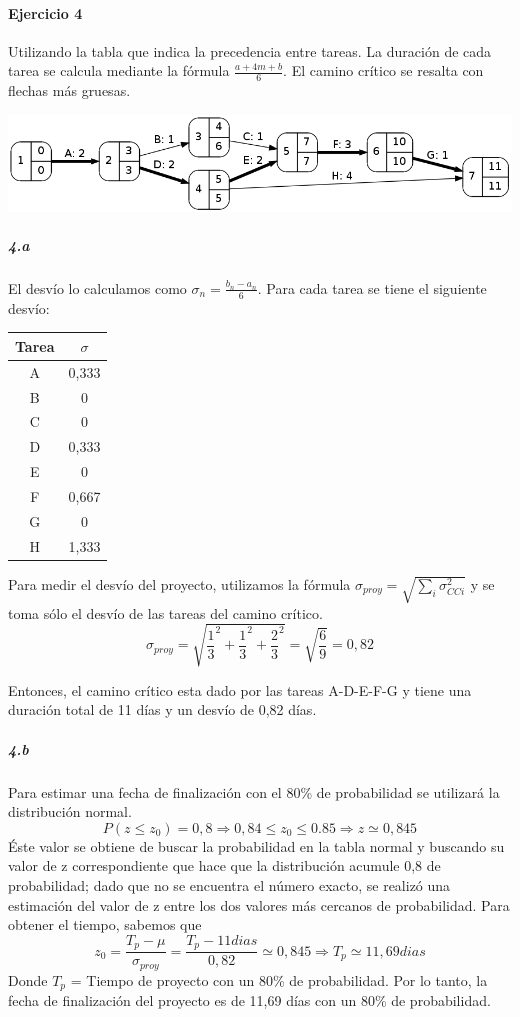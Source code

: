 \documentclass[a4paper,10pt]{article}
\begin{document}
  
  
\paragraph{Ejercicio 4} Utilizando la tabla que indica la precedencia entre tareas. La duración de cada tarea se calcula mediante la fórmula $\frac{a + 4m + b}{6}$. El camino crítico se resalta con flechas más gruesas.
   \begin{center}
    \includegraphics[scale=0.5,keepaspectratio=true]{img/ej4-1.png} 
  \end{center}
  
  \subparagraph {4.a} El desvío lo calculamos como $\sigma_n = \frac{b_n - a_n}{6}$. Para cada tarea se tiene el siguiente desvío:
  \begin{center}
   \begin{tabular}{|| c | c ||}
   \hline 
      Tarea & $\sigma$ \\ \hline \hline
      A & 0,333\\ \hline
      B & 0\\ \hline
      C & 0\\ \hline
      D & 0,333\\ \hline
      E & 0\\ \hline
      F & 0,667\\ \hline
      G & 0\\ \hline
      H & 1,333\\ \hline 
      
   \end{tabular}
   \end{center}
  Para medir el desvío del proyecto, utilizamos la fórmula $ \sigma_{proy}=\sqrt{\sum _{i}^{} \sigma_{CCi}^2 }$ y se toma sólo el desvío de las tareas del camino crítico.
  $$\sigma_{proy}=\sqrt{\frac{1}{3}^2 + \frac{1}{3}^2 + \frac{2}{3}^2} = \sqrt{\frac{6}{9}} = 0,82$$
  
  Entonces, el camino crítico esta dado por las tareas A-D-E-F-G y tiene una duración total de 11 días y un desvío de 0,82 días. 
  
  \subparagraph {4.b} Para estimar una fecha de finalización con el 80\% de probabilidad se utilizará la distribución normal. 
  $$ P(z \leq z_0) = 0,8 \Rightarrow 0,84 \le z_0 \le 0.85 \Rightarrow z \simeq 0,845$$
  Éste valor se obtiene de buscar la probabilidad en la tabla normal y buscando su valor de z correspondiente que hace que la distribución acumule 0,8 de probabilidad; 
  dado que no se encuentra el número exacto, se realizó una estimación del valor de z entre los dos valores más cercanos de probabilidad. Para obtener el tiempo, sabemos que 
  $$ z_0 = \frac{T_p - \mu}{\sigma_{proy}} = \frac{T_p - 11dias}{0,82} \simeq 0,845 \Rightarrow T_p \simeq 11,69 dias $$
  Donde $T_p$ = Tiempo de proyecto con un 80\% de probabilidad.
  Por lo tanto, la fecha de finalización del proyecto es de 11,69 días con un 80\% de probabilidad.
  
\end{document}
